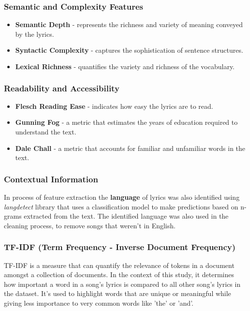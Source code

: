 \subsubsection*{Semantic and Complexity Features}
\begin{itemize}
  \item \textbf{Semantic Depth} - represents the richness and variety of
    meaning conveyed by the lyrics.
  \item \textbf{Syntactic Complexity} - captures the sophistication of
    sentence structures.
  \item \textbf{Lexical Richness} - quantifies the variety and richness of the
    vocabulary.
\end{itemize}



\subsubsection*{Readability and Accessibility}
\begin{itemize}
  \item \textbf{Flesch Reading Ease} - indicates how easy the lyrics are to
    read.
  \item \textbf{Gunning Fog} - a metric that estimates the  years of education
    required to understand the text.
  \item \textbf{Dale Chall} - a metric that accounts for familiar and
    unfamiliar words in the text.
\end{itemize}


\subsubsection*{Contextual Information}
  In process of feature extraction the \textbf{language} of lyrics was also
  identified using \textit{langdetect} library that uses a classification model
  to make predictions based on n-grams extracted from the text. The identified
  language was also used in the cleaning process, to remove songs  that
  weren't in English.

\subsubsection*{TF-IDF (Term Frequency - Inverse Document Frequency)}

TF-IDF is a measure that can quantify the relevance of tokens in a
document amongst a collection of documents. In the context of this study, it
determines how important a word in a song's lyrics is  compared to all other
song's lyrics in the dataset. It's used to highlight words that are unique or
meaningful while giving less importance to very common words like 'the' or
'and'.\cite{tfidf}

